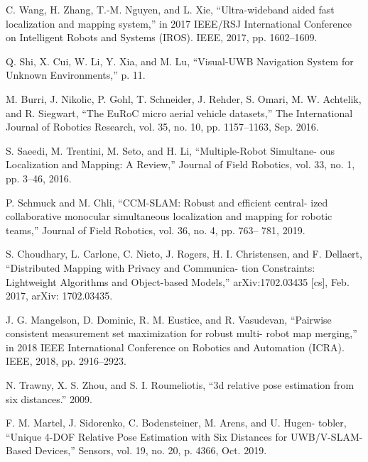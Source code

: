 \begin{translation}
\begin{thebibliography}{2}
C. Wang, H. Zhang, T.-M. Nguyen, and L. Xie, “Ultra-wideband aided
fast localization and mapping system,” in 2017 IEEE/RSJ International
Conference on Intelligent Robots and Systems (IROS). IEEE, 2017,
pp. 1602–1609.


Q. Shi, X. Cui, W. Li, Y. Xia, and M. Lu, “Visual-UWB Navigation
System for Unknown Environments,” p. 11.


 M. Burri, J. Nikolic, P. Gohl, T. Schneider, J. Rehder, S. Omari, M. W.
Achtelik, and R. Siegwart, “The EuRoC micro aerial vehicle datasets,”
The International Journal of Robotics Research, vol. 35, no. 10, pp.
1157–1163, Sep. 2016.


 S. Saeedi, M. Trentini, M. Seto, and H. Li, “Multiple-Robot Simultane-
ous Localization and Mapping: A Review,” Journal of Field Robotics,
vol. 33, no. 1, pp. 3–46, 2016.


P. Schmuck and M. Chli, “CCM-SLAM: Robust and efficient central-
ized collaborative monocular simultaneous localization and mapping
for robotic teams,” Journal of Field Robotics, vol. 36, no. 4, pp. 763–
781, 2019.


 S. Choudhary, L. Carlone, C. Nieto, J. Rogers, H. I. Christensen,
and F. Dellaert, “Distributed Mapping with Privacy and Communica-
tion Constraints: Lightweight Algorithms and Object-based Models,”
arXiv:1702.03435 [cs], Feb. 2017, arXiv: 1702.03435.


 J. G. Mangelson, D. Dominic, R. M. Eustice, and R. Vasudevan,
“Pairwise consistent measurement set maximization for robust multi-
robot map merging,” in 2018 IEEE International Conference on
Robotics and Automation (ICRA). IEEE, 2018, pp. 2916–2923.


 N. Trawny, X. S. Zhou, and S. I. Roumeliotis, “3d relative pose
estimation from six distances.” 2009.


F. M. Martel, J. Sidorenko, C. Bodensteiner, M. Arens, and U. Hugen-
tobler, “Unique 4-DOF Relative Pose Estimation with Six Distances
for UWB/V-SLAM-Based Devices,” Sensors, vol. 19, no. 20, p. 4366,
Oct. 2019.

\end{thebibliography}


\end{translation}
